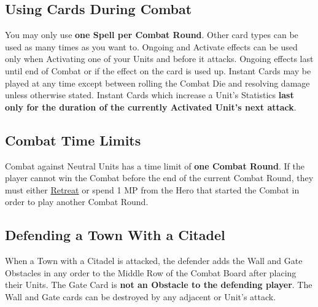 \begin{multicols}{2}
\subsection*{\hypertarget{CombatCards}{Using Cards During Combat}}
You may only use \textbf{one Spell per Combat Round}.
Other card types can be used as many times as you want to.
Ongoing  and  Activate effects can be used only when Activating one of your Units and before it attacks.
Ongoing effects last until end of Combat or if the effect on the card is used up.
Instant  Cards may be played at any time except between rolling the Combat Die and resolving damage unless otherwise stated.
Instant Cards which increase a Unit's Statistics \textbf{last only for the duration of the currently Activated Unit's next attack}.
\subsection*{\hypertarget{Timelimit}{Combat Time Limits}}
Combat against Neutral Units has a time limit of \textbf{one Combat Round}.
If the player cannot win the Combat before the end of the current Combat Round, they must either \hyperlink{Endcombat}{Retreat} or spend 1 MP from the Hero that started the Combat in order to play another Combat Round.\par
{}

\subsection*{\hypertarget{Walls}{Defending a Town With a Citadel}}

When a Town with a Citadel is attacked, the defender adds the Wall and Gate Obstacles in any order to the Middle Row of the Combat Board after placing their Units.
The Gate Card is \textbf{not an Obstacle to the defending player}.
The Wall and Gate cards can be destroyed by any adjacent  or  Unit's attack.\par
{}\par


\end{multicols}
